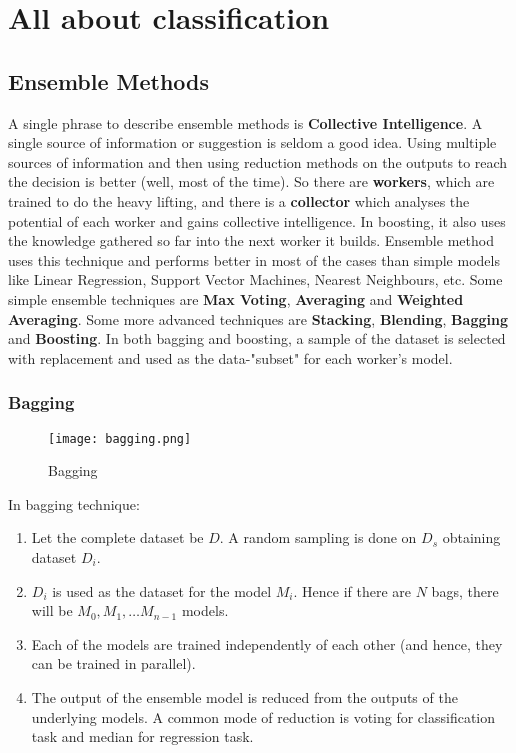 
\chapter{All about classification} %

\label{Chapter6} %


\section{Ensemble Methods}

A single phrase to describe ensemble methods is \textbf{Collective Intelligence}. A single source of information or suggestion is seldom a good idea. Using multiple sources of information and then using reduction methods on the outputs to reach the decision is better (well, most of the time). So there are \textbf{workers}, which are trained to do the heavy lifting, and there is a \textbf{collector} which analyses the potential of each worker and gains collective intelligence. In boosting, it also uses the knowledge gathered so far into the next worker it builds. Ensemble method uses this technique and performs better in most of the cases than simple models like Linear Regression, Support Vector Machines, Nearest Neighbours, etc. Some simple ensemble techniques are \textbf{Max Voting}, \textbf{Averaging} and \textbf{Weighted Averaging}. Some more advanced techniques are \textbf{Stacking}, \textbf{Blending}, \textbf{Bagging} and \textbf{Boosting}. In both bagging and boosting, a sample of the dataset is selected with replacement and used as the data-"subset" for each worker's model.

\subsection{Bagging}

\begin{figure}[H]
\centering
\texttt{[image: bagging.png]}
\caption{Bagging}
\label{fig-6-1}
\end{figure}

In bagging technique:
\begin{enumerate}
    \item Let the complete dataset be $D$. A random sampling is done on $D_s$ obtaining dataset $D_i$.
    \item $D_i$ is used as the dataset for the model $M_i$. Hence if there are $N$ bags, there will be $M_0, M_1, \ldots M_{n - 1}$ models.
    \item Each of the models are trained independently of each other (and hence, they can be trained in parallel). 
    \item The output of the ensemble model is reduced from the outputs of the underlying models. A common mode of reduction is voting for classification task and median for regression task.
\end{enumerate}

